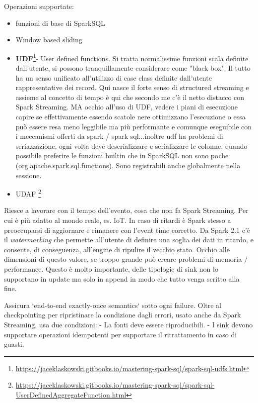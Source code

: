 \documentclass[12pt,italian]{article}
\begin{document}
Operazioni supportate:
\begin{itemize}
	\item funzioni di base di SparkSQL 
	\item Window based sliding
	\item \textbf{UDF}\footnote{\url{https://jaceklaskowski.gitbooks.io/mastering-spark-sql/spark-sql-udfs.html}}- User defined functions. Si tratta normalissime funzioni scala definite dall'utente, si possono tranquillamente considerare come "black box". Il tutto ha un senso unificato all'utilizzo di case class definite dall'utente rappresentative dei record. Qui nasce il forte senso di structured streaming e assieme al concetto di tempo è qui che secondo
	me c'è il netto distacco con Spark Streaming. MA occhio all'uso di UDF, vedere i piani di esecuzione capire se effettivamente essendo scatole nere ottimizzano l'esecuzione o essa può essere resa meno leggibile ma più performante e comunque eseguibile con i meccanismi offerti da spark / spark sql...inoltre udf ha problemi di seriazzazione, ogni volta deve deserializzare e serializzare le colonne, quando possibile preferire le funzioni builtin che in SparkSQL non sono poche (org.apache.spark.sql.functions). Sono registrabili anche globalmente nella sessione. %
	\item UDAF \footnote{\url{https://jaceklaskowski.gitbooks.io/mastering-spark-sql/spark-sql-UserDefinedAggregateFunction.html}} %
\end{itemize}

Riesce a lavorare con il tempo dell'evento, cosa che non fa Spark Streaming.
Per cui è più adatto al mondo reale, es. IoT.
In caso di ritardi è Spark stesso a preoccuparsi di aggiornare e rimanere con l'event time corretto.
Da Spark 2.1 c'è il \textit{watermarking} che permette all'utente di definire una soglia dei dati in ritardo, e consente, di conseguenza, all'engine di ripulire il vecchio stato.
Occhio alle dimensioni di questo valore, se troppo grande può creare problemi di memoria / performance. Questo è molto importante, delle tipologie di sink non lo supportano in update ma solo in append in modo  che tutto venga scritto alla fine.

Assicura `end-to-end exactly-once semantics` sotto ogni failure.
Oltre al checkpointing per ripristinare la condizione dagli errori, usato anche da Spark Streaming, usa due condizioni:
- La fonti deve essere riproducibili.
- I sink devono supportare operazioni idempotenti per supportare il ritrattamento in caso di guasti.
\end{document}
